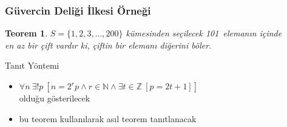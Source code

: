 \documentclass[dvipsnames]{beamer}
\theoremstyle{definition}
\theoremstyle{example}
\theoremstyle{plain}
\newtheorem{teorem}[theorem]{Teorem}
\begin{document}
\begin{frame}
  \frametitle{Güvercin Deliği İlkesi Örneği}

  \begin{teorem}
    $S = \{1,2,3,\dots,200\}$ kümesinden seçilecek 101~elemanın içinde\\
    en az bir çift vardır ki, çiftin bir elemanı diğerini böler.
  \end{teorem}

  \pause
  \begin{block}{Tanıt Yöntemi}
    \begin{itemize}
      \item $\forall n~\exists ! p~
        [n = 2^r p \wedge r \in \mathbb{N}
          \wedge \exists t \in \mathbb Z~[p = 2t + 1]]$\\
        olduğu gösterilecek

      \item bu teorem kullanılarak asıl teorem tanıtlanacak
    \end{itemize}
  \end{block}
\end{frame}
\end{document}
